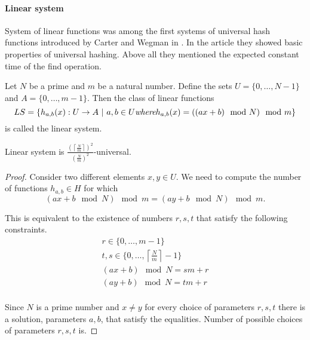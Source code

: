 \paragraph{Linear system}
System of linear functions was among the first systems of universal hash functions introduced by Carter and Wegman in \cite{DBLP:journals/jcss/CarterW79}. In the article they showed basic properties of universal hashing. Above all they mentioned the expected constant time of the find operation.
\begin{definition}
Let $N$ be a prime and $m$ be a natural number. Define the sets $U = \{0, \dots, N - 1 \}$ and $A = \{0, \dots, m - 1\}$. Then the class of linear functions 
\[ LS = \{h_{a, b}(x): U \rightarrow A \ | \  a, b \in U \textit{where} h_{a, b}(x) = ((ax + b) \mod N) \mod m \} \]
is called the linear system.
\end{definition}

\begin{remark}
Linear system is $\frac{\left(\left\lceil \frac{N}{m} \right\rceil\right)^2}{\left(\frac{N}{m}\right)^2}$-universal.
\end{remark}
\begin{proof}
Consider two different elements $x, y \in U$. We need to compute the number of functions $h_{a, b} \in H$ for which 
\[ (ax + b \mod N) \mod m = (ay + b \mod N) \mod m \textit{.} \]

This is equivalent to the existence of numbers $r, s, t$ that satisfy the following constraints.
\begin{gather*}
r \in \{0, \dots, m - 1 \} \\
t, s \in \{0, \dots, \left \lceil \frac{N}{m} \right \rceil - 1\} \\
(ax + b) \mod N = s m + r \\
(ay + b) \mod N = t m + r \\
\end{gather*}

Since $N$ is a prime number and $x \neq y$ for every choice of parameters $r, s, t$ there is a solution, parameters $a, b$, that satisfy the equalities.
Number of possible choices of parameters $r, s, t$ is.
\end{proof}


